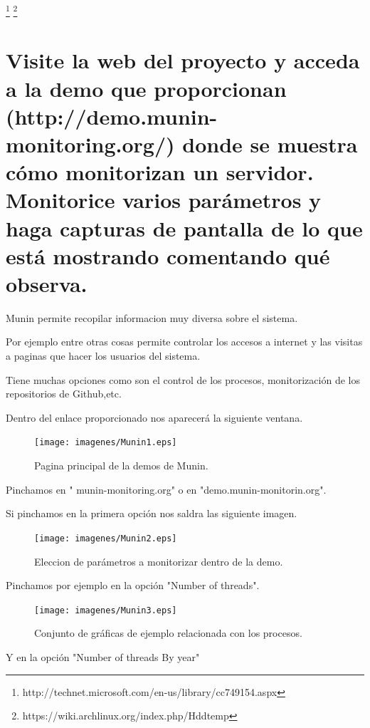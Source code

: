 \footnote{http://technet.microsoft.com/en-us/library/cc749154.aspx}
\footnote{https://wiki.archlinux.org/index.php/Hddtemp}

\section{ Visite la web del proyecto y acceda a la demo que proporcionan (http://demo.munin-monitoring.org/) donde se muestra cómo monitorizan un servidor. Monitorice varios parámetros y haga capturas de pantalla de lo que está mostrando comentando qué observa.}

Munin permite recopilar informacion muy diversa sobre el sistema.

Por ejemplo entre otras cosas permite controlar los accesos a internet y las visitas a paginas que hacer los usuarios del sistema.

Tiene muchas opciones como son el control de los procesos, monitorización de los repositorios de Github,etc.

Dentro del enlace proporcionado nos aparecerá la siguiente ventana. 

\begin{figure}[H]
\begin{center}
\texttt{[image: imagenes/Munin1.eps]}
\caption{Pagina principal de la demos de Munin.}
\end{center}
\end{figure}

Pinchamos en " munin-monitoring.org" o en "demo.munin-monitorin.org".

Si pinchamos en la primera opción nos saldra las siguiente imagen.

\begin{figure}[H]
\begin{center}
\texttt{[image: imagenes/Munin2.eps]}
\caption{Eleccion de parámetros a monitorizar dentro de la demo.}
\end{center}
\end{figure}

Pinchamos por ejemplo en la opción "Number of threads".

\begin{figure}[H]
\begin{center}
\texttt{[image: imagenes/Munin3.eps]}
\caption{Conjunto de gráficas de ejemplo relacionada con los procesos.}
\end{center}
\end{figure}

Y en la opción "Number of threads By year"

